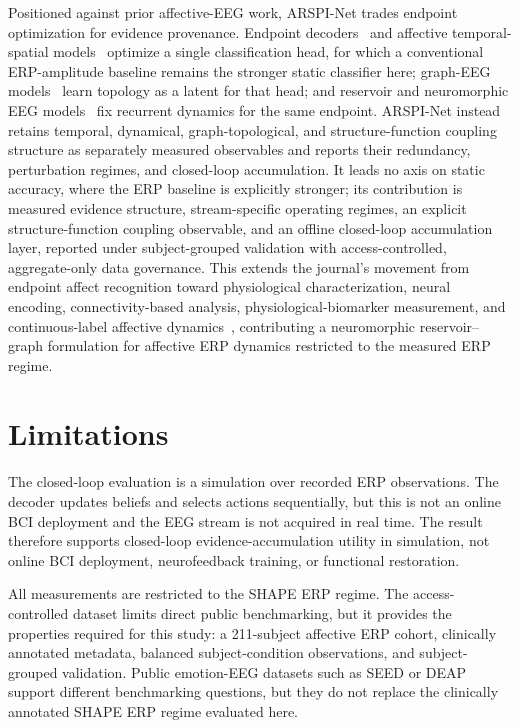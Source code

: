 \documentclass[journal]{IEEEtran}
\begin{document}
Positioned against prior affective-EEG work, ARSPI-Net trades endpoint optimization for evidence provenance. Endpoint decoders~\cite{lawhern2018eegnet,ding2024eegdeformer} and affective temporal-spatial models~\cite{ding2023tsception} optimize a single classification head, for which a conventional ERP-amplitude baseline remains the stronger static classifier here; graph-EEG models~\cite{zhong2022rgnn,klepl2024gnn} learn topology as a latent for that head; and reservoir and neuromorphic EEG models~\cite{fourati2018reservoir,gong2023sglnet,cai2024spiking} fix recurrent dynamics for the same endpoint. ARSPI-Net instead retains temporal, dynamical, graph-topological, and structure-function coupling structure as separately measured observables and reports their redundancy, perturbation regimes, and closed-loop accumulation. It leads no axis on static accuracy, where the ERP baseline is explicitly stronger; its contribution is measured evidence structure, stream-specific operating regimes, an explicit structure-function coupling observable, and an offline closed-loop accumulation layer, reported under subject-grouped validation with access-controlled, aggregate-only data governance. This extends the journal's movement from endpoint affect recognition toward physiological characterization, neural encoding, connectivity-based analysis, physiological-biomarker measurement, and continuous-label affective dynamics~\cite{pan2026encoding,kumar2026nasal,jiang2025seedvii}, contributing a neuromorphic reservoir--graph formulation for affective ERP dynamics restricted to the measured ERP regime.

\section{Limitations}
The closed-loop evaluation is a simulation over recorded ERP observations. The decoder updates beliefs and selects actions sequentially, but this is not an online BCI deployment and the EEG stream is not acquired in real time. The result therefore supports closed-loop evidence-accumulation utility in simulation, not online BCI deployment, neurofeedback training, or functional restoration.

All measurements are restricted to the SHAPE ERP regime. The access-controlled dataset limits direct public benchmarking, but it provides the properties required for this study: a 211-subject affective ERP cohort, clinically annotated metadata, balanced subject-condition observations, and subject-grouped validation. Public emotion-EEG datasets such as SEED or DEAP support different benchmarking questions, but they do not replace the clinically annotated SHAPE ERP regime evaluated here.
\end{document}
